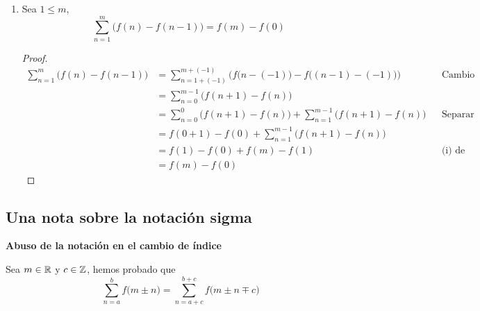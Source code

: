 \begin{enumerate}[label=\alph*)]
\begin{enumerate}[label=\roman*)]
  \item Sea $1\leq m$, \[\sum_{n=1}^{m} \Big(f(n)-f(n-1)\Big) = f(m)-f(0)\]
  \begin{proof}\leavevmode
    \begin{align*}
      \sum_{n=1}^{m} \Big(f(n)-f(n-1)\Big) &= \sum_{n=1+(-1)}^{m+(-1)} \bigg( f\big(n-(-1)\big)-f\big((n-1)-(-1)\big)\bigg) && \text{Cambio de índice}\\
      &= \sum_{n=0}^{m-1} \Big(f(n+1)-f(n)\Big)\\
      &= \sum_{n=0}^{0} \Big(f(n+1)-f(n)\Big) + \sum_{n=1}^{m-1} \Big(f(n+1)-f(n)\Big) && \text{Separar la suma}\\
      &= f(0+1) - f(0) + \sum_{n=1}^{m-1} \Big(f(n+1)-f(n)\Big)\\
      &= f(1) - f(0) + f(m) - f(1) && \text{(i) de este corolario}\\
      &= f(m) - f(0)
    \end{align*}
  \end{proof}
  \end{enumerate}
  
  \end{enumerate}

\subsection*{Una nota sobre la notación sigma}




\textbf{Abuso de la notación en el cambio de índice}

Sea $m\in \mathbb{R}$ y $c\in \mathbb{Z}$, hemos probado que \[\sum_{n=a}^{b}f\bigl(m\pm n\bigr) = \sum_{n=a+c}^{b+c}f\bigl(m\pm n \mp c\bigr)\]

